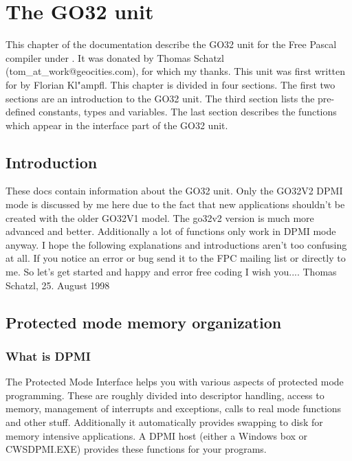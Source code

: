 \chapter{The GO32 unit}
\label{ch:go32unit}

This chapter of the documentation describe the GO32 unit for the Free Pascal
compiler under \dos. It was donated by Thomas Schatzl
(tom\_at\_work@geocities.com), for which my thanks.
This unit was first written for \dos by Florian Kl"ampfl.
This chapter is divided in four sections. The first two sections are an
introduction to the GO32 unit. The third section lists the pre-defined
constants, types and variables. The last section describes the functions
which appear in the interface part of the GO32 unit.
\section{Introduction}
These docs contain information about the GO32 unit. Only the GO32V2 DPMI
mode is discussed by me here due to the fact that new applications shouldn't
be created with the older GO32V1 model. The go32v2 version is much more advanced and
better. Additionally a lot of functions only work in DPMI mode anyway.
I hope the following explanations and introductions aren't too confusing at
all. If you notice an error or bug send it to the FPC mailing list or
directly to me.
So let's get started and happy and error free coding I wish you....
Thomas Schatzl, 25. August 1998
\section{Protected mode memory organization}
\subsection{What is DPMI}
The \dos Protected Mode Interface helps you with various aspects of protected
mode programming. These are roughly divided into descriptor handling, access
to \dos memory, management of interrupts and exceptions, calls to real mode
functions and other stuff. Additionally it automatically provides swapping
to disk for memory intensive applications.
A DPMI host (either a Windows \dos box or CWSDPMI.EXE) provides these
functions for your programs.

